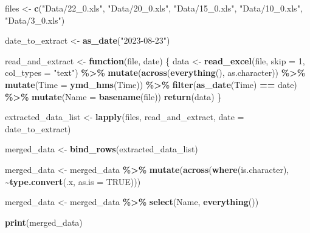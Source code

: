 \documentclass[
]{article}
\newenvironment{Shaded}{\begin{snugshade}}{\end{snugshade}}
\newcommand{\AttributeTok}[1]{\textcolor[rgb]{0.13,0.29,0.53}{#1}}
\newcommand{\ConstantTok}[1]{\textcolor[rgb]{0.56,0.35,0.01}{#1}}
\newcommand{\ControlFlowTok}[1]{\textcolor[rgb]{0.13,0.29,0.53}{\textbf{#1}}}
\newcommand{\DecValTok}[1]{\textcolor[rgb]{0.00,0.00,0.81}{#1}}
\newcommand{\FunctionTok}[1]{\textcolor[rgb]{0.13,0.29,0.53}{\textbf{#1}}}
\newcommand{\NormalTok}[1]{#1}
\newcommand{\OtherTok}[1]{\textcolor[rgb]{0.56,0.35,0.01}{#1}}
\newcommand{\SpecialCharTok}[1]{\textcolor[rgb]{0.81,0.36,0.00}{\textbf{#1}}}
\newcommand{\StringTok}[1]{\textcolor[rgb]{0.31,0.60,0.02}{#1}}
\begin{document}
\begin{Shaded}
\begin{Highlighting}[]
\NormalTok{files }\OtherTok{\textless{}{-}} \FunctionTok{c}\NormalTok{(}\StringTok{"Data/22\_0.xls"}\NormalTok{, }\StringTok{"Data/20\_0.xls"}\NormalTok{, }\StringTok{"Data/15\_0.xls"}\NormalTok{, }\StringTok{"Data/10\_0.xls"}\NormalTok{, }\StringTok{"Data/3\_0.xls"}\NormalTok{)}


\NormalTok{date\_to\_extract }\OtherTok{\textless{}{-}} \FunctionTok{as\_date}\NormalTok{(}\StringTok{"2023{-}08{-}23"}\NormalTok{)}


\NormalTok{read\_and\_extract }\OtherTok{\textless{}{-}} \ControlFlowTok{function}\NormalTok{(file, date) \{}
\NormalTok{  data }\OtherTok{\textless{}{-}} \FunctionTok{read\_excel}\NormalTok{(file, }\AttributeTok{skip =} \DecValTok{1}\NormalTok{, }\AttributeTok{col\_types =} \StringTok{"text"}\NormalTok{) }\SpecialCharTok{\%\textgreater{}\%} 
    \FunctionTok{mutate}\NormalTok{(}\FunctionTok{across}\NormalTok{(}\FunctionTok{everything}\NormalTok{(), as.character)) }\SpecialCharTok{\%\textgreater{}\%}
    \FunctionTok{mutate}\NormalTok{(}\AttributeTok{Time =} \FunctionTok{ymd\_hms}\NormalTok{(Time)) }\SpecialCharTok{\%\textgreater{}\%}
    \FunctionTok{filter}\NormalTok{(}\FunctionTok{as\_date}\NormalTok{(Time) }\SpecialCharTok{==}\NormalTok{ date) }\SpecialCharTok{\%\textgreater{}\%}
    \FunctionTok{mutate}\NormalTok{(}\AttributeTok{Name =} \FunctionTok{basename}\NormalTok{(file))  }
  \FunctionTok{return}\NormalTok{(data)}
\NormalTok{\}}

\NormalTok{extracted\_data\_list }\OtherTok{\textless{}{-}} \FunctionTok{lapply}\NormalTok{(files, read\_and\_extract, }\AttributeTok{date =}\NormalTok{ date\_to\_extract)}


\NormalTok{merged\_data }\OtherTok{\textless{}{-}} \FunctionTok{bind\_rows}\NormalTok{(extracted\_data\_list)}


\NormalTok{merged\_data }\OtherTok{\textless{}{-}}\NormalTok{ merged\_data }\SpecialCharTok{\%\textgreater{}\%}
  \FunctionTok{mutate}\NormalTok{(}\FunctionTok{across}\NormalTok{(}\FunctionTok{where}\NormalTok{(is.character), }\SpecialCharTok{\textasciitilde{}}\FunctionTok{type.convert}\NormalTok{(.x, }\AttributeTok{as.is =} \ConstantTok{TRUE}\NormalTok{)))}


\NormalTok{merged\_data }\OtherTok{\textless{}{-}}\NormalTok{ merged\_data }\SpecialCharTok{\%\textgreater{}\%} \FunctionTok{select}\NormalTok{(Name, }\FunctionTok{everything}\NormalTok{())}


\FunctionTok{print}\NormalTok{(merged\_data)}
\end{Highlighting}
\end{Shaded}
\end{document}
